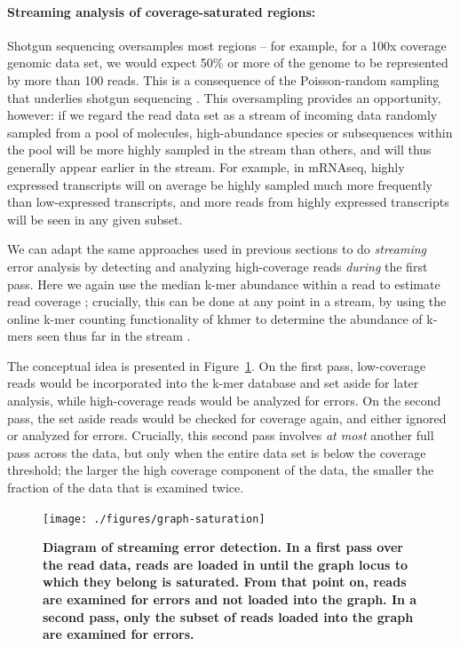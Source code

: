 \documentclass{article}
\begin{document}
\paragraph{Streaming analysis of coverage-saturated regions:}

Shotgun sequencing oversamples most regions -- for example, for a 100x
coverage genomic data set, we would expect 50\% or more of the genome
to be represented by more than 100 reads.  This is a consequence of
the Poisson-random sampling that underlies shotgun sequencing \cite{Waterman}.
This oversampling provides an opportunity, however: if we
regard the read data set as a stream of incoming data randomly sampled
from a pool of molecules, high-abundance species or subsequences
within the pool will be more highly sampled in the stream than others,
and will thus generally appear earlier in the stream.  For example, in
mRNAseq, highly expressed transcripts will on average be highly
sampled much more frequently than low-expressed transcripts, and more
reads from highly expressed transcripts will be seen in any given
subset.

We can adapt the same approaches used in previous sections to do {\em
  streaming} error analysis by detecting and analyzing high-coverage
reads {\em during} the first pass.  Here we again use the median k-mer
abundance within a read to estimate read coverage \cite{Brown2012};
crucially, this can be done at any point in a stream, by using the
online k-mer counting functionality of khmer to determine the
abundance of k-mers seen thus far in the stream \cite{Zhang2014}.

The conceptual idea is presented in Figure~\ref{fig:concept}.  On the
first pass, low-coverage reads would be incorporated into the k-mer
database and set aside for later analysis, while high-coverage reads
would be analyzed for errors. On the second pass, the set aside reads
would be checked for coverage again, and either ignored or analyzed
for errors.  Crucially, this second pass involves {\em at most}
another full pass across the data, but only when the entire data set
is below the coverage threshold; the larger the high coverage
component of the data, the smaller the fraction of the data that is
examined twice.

\begin{figure}[!ht]
 \centerline{\texttt{[image: ./figures/graph-saturation]}}
\caption{\bf Diagram of streaming error detection. In a first pass
over the read data, reads are loaded in until the graph locus to which
they belong is saturated.  From that point on, reads are examined for
errors and not loaded into the graph.  In a second pass, only the subset
of reads loaded into the graph are examined for errors.}
\label{fig:concept}
\end{figure}
\end{document}
